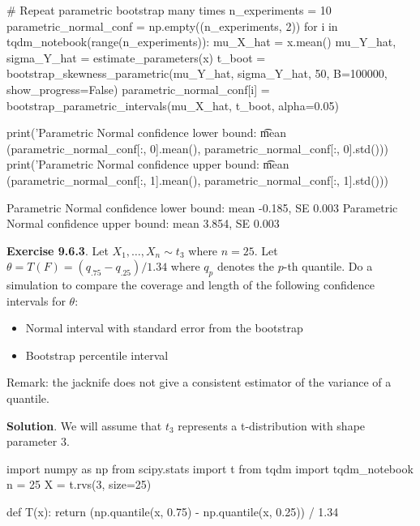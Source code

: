 \begin{python}
# Repeat parametric bootstrap many times
n_experiments = 10
parametric_normal_conf = np.empty((n_experiments, 2))
for i in tqdm_notebook(range(n_experiments)):
    mu_X_hat = x.mean()
    mu_Y_hat, sigma_Y_hat = estimate_parameters(x)
    t_boot = bootstrap_skewness_parametric(mu_Y_hat, sigma_Y_hat, 50, B=100000, 
                                                                      show_progress=False)
    parametric_normal_conf[i] = bootstrap_parametric_intervals(mu_X_hat, t_boot, alpha=0.05)
\end{python}

\begin{python}
print('Parametric Normal confidence lower bound: \t mean %
      (parametric_normal_conf[:, 0].mean(), parametric_normal_conf[:, 0].std()))
print('Parametric Normal confidence upper bound: \t mean %
      (parametric_normal_conf[:, 1].mean(), parametric_normal_conf[:, 1].std()))
\end{python}
\begin{console}
Parametric Normal confidence lower bound:        mean -0.185, SE 0.003
Parametric Normal confidence upper bound:        mean 3.854, SE 0.003
\end{console}

\textbf{Exercise 9.6.3}. Let \(X_{1}, \dots, X_{n} \sim t_{3}\) where
\(n = 25\). Let \(\theta = T(F) = (q_{.75} - q_{.25})/1.34\) where
\(q_p\) denotes the \(p\)-th quantile. Do a simulation to compare the
coverage and length of the following confidence intervals for
\(\theta\):
\begin{itemize}[tightlist]
\item
  Normal interval with standard error from the bootstrap
\item
  Bootstrap percentile interval
\end{itemize}
Remark: the jacknife does not give a consistent estimator of the
variance of a quantile.

\textbf{Solution}. We will assume that \(t_{3}\) represents a
t-distribution with shape parameter 3.

\begin{python}
import numpy as np
from scipy.stats import t
from tqdm import tqdm_notebook
n = 25
X = t.rvs(3, size=25)
\end{python}

\begin{python}
def T(x):
    return (np.quantile(x, 0.75) - np.quantile(x, 0.25)) / 1.34
\end{python}

